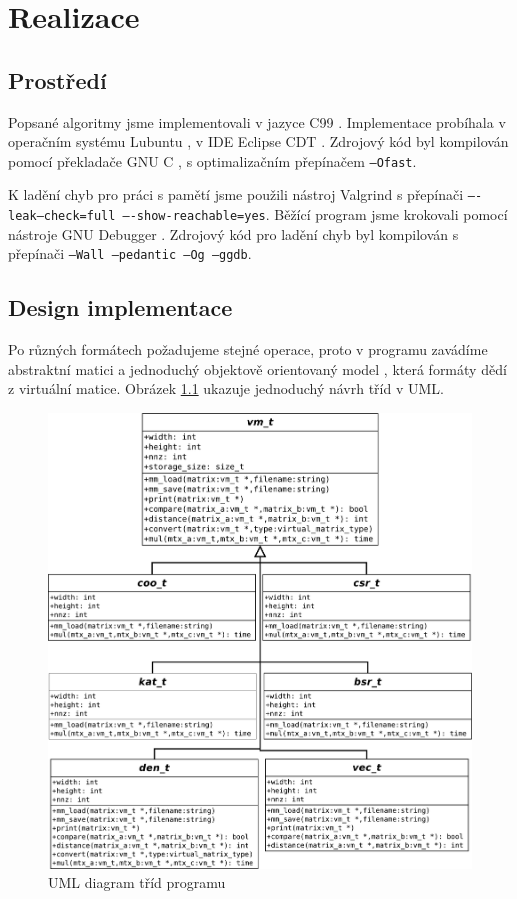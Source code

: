 \chapter{Realizace}

\section{Prostředí}

Popsané algoritmy jsme implementovali v jazyce C99 \cite{ISO:C99}. Implementace probíhala v operačním systému Lubuntu \cite{lubuntu}, v IDE Eclipse CDT \cite{cdt}. Zdrojový kód byl kompilován pomocí překladače GNU C \cite{gcc}, s optimalizačním přepínačem \texttt{--Ofast}.

K ladění chyb pro práci s pamětí jsme použili nástroj Valgrind \cite{valgrind} s přepínači \texttt{----leak--check=full ----show-reachable=yes}. Běžící program jsme krokovali pomocí nástroje GNU Debugger \cite{gdb}. Zdrojový kód pro ladění chyb byl kompilován s přepínači \texttt{--Wall --pedantic --Og --ggdb}.


\section{Design implementace}

Po různých formátech požadujeme stejné operace, proto v programu zavádíme abstraktní matici a jednoduchý objektově orientovaný model \cite{schreiner1994objektorientierte}, která formáty dědí z virtuální matice. Obrázek \ref{fig:uml} ukazuje jednoduchý návrh tříd v UML.
	
\begin{figure}[htb]
	\includegraphics[width=1.0\textwidth]{./images/uml/uml}
	\caption{UML diagram tříd programu}
	\label{fig:uml}
\end{figure}

